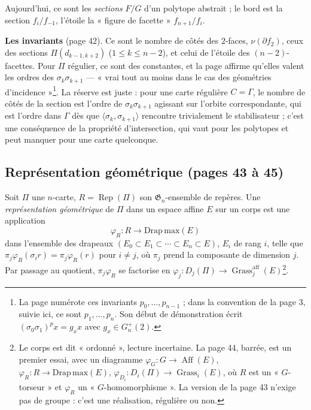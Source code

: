 \documentclass[11pt,a4paper]{article}
\begin{document}
Aujourd'hui, ce sont les \emph{sections} $F/G$ d'un polytope abstrait ; le bord
est la section $f_i/f_{-1}$, l'étoile la « figure de facette » $f_{n+1}/f_i$.

\textbf{Les invariants} (page 42). Ce sont le nombre de côtés des $2$-faces,
$\nu(\partial f_2)$, ceux des sections $\Pi(d_{k-1,k+2})$ ($1 \leq k \leq n-2$),
et celui de l'étoile des $(n-2)$-facettes. Pour $\Pi$ régulier, ce sont des
constantes, et la page affirme qu'elles valent les ordres des
$\sigma_k\sigma_{k+1}$ --- « vrai tout au moins dans le cas des géométries
d'incidence »\footnote{La page numérote ces invariants $p_0, \dots, p_{n-1}$ ;
dans la convention de la page 3, suivie ici, ce sont $p_1, \dots, p_n$. Son
début de démonstration écrit $(\sigma_0\sigma_1)^p x = g_x x$ avec $g_x \in
G_n^{+}(2)$.}. La réserve est juste : pour une carte régulière $C = \Gamma$,
le nombre de côtés de la section est l'ordre de $\sigma_k\sigma_{k+1}$ agissant
sur l'orbite correspondante, qui est l'ordre dans $\Gamma$ dès que $\langle
\sigma_k, \sigma_{k+1}\rangle$ rencontre trivialement le stabilisateur ; c'est
une conséquence de la propriété d'intersection, qui vaut pour les polytopes et
peut manquer pour une carte quelconque.

\subsection*{Représentation géométrique (pages 43 à 45)}

Soit $\Pi$ une $n$-carte, $R = \operatorname{Rep}(\Pi)$ son $\mathfrak{G}_n$-ensemble
de repères. Une \emph{représentation géométrique} de $\Pi$ dans un espace affine
$E$ sur un corps est une application
\[
\varphi_R : R \to \mathrm{Drap\,max}(E)
\]
dans l'ensemble des drapeaux $(E_0 \subset E_1 \subset \cdots \subset E_n
\subset E)$, $E_i$ de rang $i$, telle que $\pi_j \varphi_R(\sigma_i r) = \pi_j
\varphi_R(r)$ pour $i \neq j$, où $\pi_j$ prend la composante de dimension $j$.
Par passage au quotient, $\pi_j\varphi_R$ se factorise en $\varphi_j : D_j(\Pi) \to
\operatorname{Grass}^{\mathrm{aff}}_j(E)$\footnote{Le corps est dit « ordonné »,
lecture incertaine. La page 44, barrée, est un premier essai, avec un
diagramme $\varphi_G : G \to \operatorname{Aff}(E)$, $\varphi_R : R \to
\mathrm{Drap\,max}(E)$, $\varphi_{D_i} : D_i(\Pi) \to
\operatorname{Grass}_i(E)$, où $R$ est un « $G$-torseur » et $\varphi_R$ un
« $G$-homomorphisme ». La version de la page 43 n'exige pas de groupe : c'est
une réalisation, régulière ou non.}.
\end{document}
